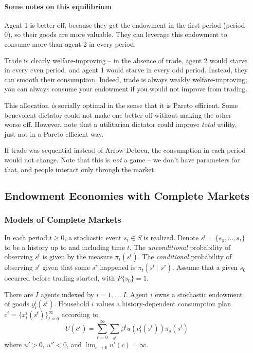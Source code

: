 \documentclass[10pt]{article}
\begin{document}
\paragraph{Some notes on this equilibrium}
Agent 1 is better off, because they get the endowment in the first period (period 0), so their goods are more valuable. They can leverage this endowment to consume more than agent 2 in every period.

Trade is clearly welfare-improving -- in the absence of trade, agent 2 would starve in every even period, and agent 1 would starve in every odd period. Instead, they can smooth their consumption. Indeed, trade is always weakly welfare-improving; you can always consume your endowment if you would not improve from trading.

This allocation \emph{is	} socially optimal in the sense that it is Pareto efficient. Some benevolent dictator could not make one better off without making the other worse off. However, note that a utilitarian dictator could improve \emph{total} utility, just not in a Pareto efficient way.

If trade was sequential instead of Arrow-Debreu, the consumption in each period would not change. Note that this is \emph{not} a game -- we don't have parameters for that, and people interact only through the market.

\newpage
\subsection{Endowment Economies with Complete Markets}

\subsubsection{Models of Complete Markets}

\begin{model} 
	In each period $t \ge 0$, a stochastic event $s_t \in S$ is realized. Denote $s^t = \{s_0,\dots,s_t\}$ to be a history up to and including time $t$. The \emph{unconditional} probability of observing $s^t$ is given by the measure $\pi_t(s^t)$. The \emph{conditional} probability of observing $s^t$ given that some $s^\tau$ happened is $\pi_t(s^t \mid s^\tau)$. Assume that a given $s_0$ occurred before trading started, with $P\{s_0\} = 1$.
\end{model}

\begin{model} 
	There are $I$ agents indexed by $i = 1,\dots,I$. Agent $i$ owns a stochastic endowment of goods $y_t^i(s^t)$. Household $i$ values a history-dependent consumption plan $c^i = \{x_t^i(s^t)\}_{t=0}^\infty$ according to
	\[
	U(c^i) = \sum_{t=0}^\infty \sum_{s^t} \beta^t u(c_t^i(s^t)) \pi_s(s^t)
	\]
	where $u' > 0$, $u'' < 0$, and $\lim_{c\to 0} u'(c) = \infty$.
\end{model}
\end{document}
